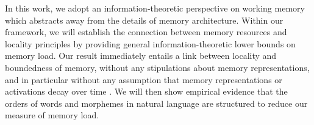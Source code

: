 In this work, we adopt an information-theoretic perspective on working memory which abstracts away from the details of memory architecture.
Within our framework, we will establish the connection between memory resources and locality principles by providing general information-theoretic lower bounds on memory load.
Our result immediately entails a link between locality and boundedness of memory, without any stipulations about memory representations, and in particular without any assumption that memory representations or activations decay over time \citep[as was required in][]{gibson1998linguistic, lewis-activation-based-2005, futrell2020lossy}.
We will then show empirical evidence that the orders of words and morphemes in natural language are structured to reduce our measure of memory load.




